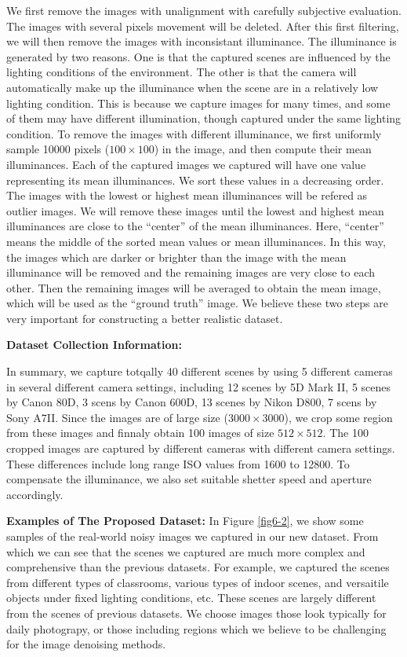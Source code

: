 We first remove the images with unalignment with carefully subjective evaluation. The images with several pixels movement will be deleted. After this first filtering, we will then remove the images with inconsistant illuminance. The illuminance is generated by two reasons. One is that the captured scenes are influenced by the lighting conditions of the environment. The other is that the camera will automatically make up the illuminance when the scene are in a relatively low lighting condition. This is because we capture images for many times, and some of them may have different illumination, though captured under the same lighting condition. To remove the images with different illuminance, we first uniformly sample 10000 pixels ($100\times100$) in the image, and then compute their mean illuminances. Each of the captured images we captured will have one value representing its mean illuminances. We sort these values in a decreasing order. The images with the lowest or highest mean illuminances will be refered as outlier images. We will remove these images until the lowest and highest mean illuminances are close to the ``center'' of the mean illuminances. Here, ``center'' means the middle of the sorted mean values or mean illuminances. In this way, the images which are darker or brighter than the image with the mean illuminance will be removed and the remaining images are very close to each other. Then the remaining images will be averaged to obtain the mean image, which will be used as the ``ground truth'' image. We believe these two steps are very important for constructing a better realistic dataset.


\textbf{Dataset Collection Information:} 

In summary, we capture totqally 40 different scenes by using 5 different cameras in several different camera settings, including 12 scenes by 5D Mark II, 5 scenes by Canon 80D, 3 scens by Canon 600D, 13 scenes by Nikon D800, 7 scens by Sony A7II. Since the images are of large size ($3000\times3000$), we crop some region from these images and finnaly obtain 100 images of size $512\times512$. The 100 cropped images are captured by different cameras with different camera settings. These differences include long range ISO values from 1600 to 12800. To compensate the illuminance, we also set suitable shetter speed and aperture accordingly. 

\textbf{Examples of The Proposed Dataset:} In Figure \ref{fig6-2}, we show some samples of the real-world noisy images we captured in our new dataset. From which we can see that the scenes we captured are much more complex and comprehensive than the previous datasets. For example, we captured the scenes from different types of classrooms, various types of indoor scenes, and versaitile objects under fixed lighting conditions, etc. These scenes are largely different from the scenes of previous datasets. We choose images those look typically for daily photograpy, or those including regions which we believe to be challenging for the image denoising methods. 

